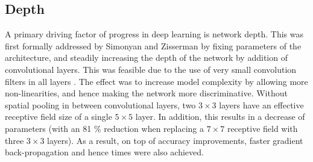 \documentclass[12pt]{llncs}
\begin{document}
\subsection{Depth}
A primary driving factor of progress in deep learning is network depth. This was first formally addressed by Simonyan and Zisserman by fixing parameters of the architecture, and steadily increasing the depth of the network by addition of convolutional layers. This was feasible due to the use of very small convolution filters in all layers \cite{simonyan2014very}. The effect was to increase model complexity by allowing more non-linearities, and hence making the network more discriminative. Without spatial pooling in between convolutional layers, two $3 \times 3$ layers have an effective receptive field size of a single $5 \times 5$ layer. In addition, this results in a decrease of parameters (with an 81 \% reduction when replacing a $7 \times 7$ receptive field with three $3\times3$ layers). As a result, on top of accuracy improvements, faster gradient back-propagation and hence times were also achieved.


\end{document}
